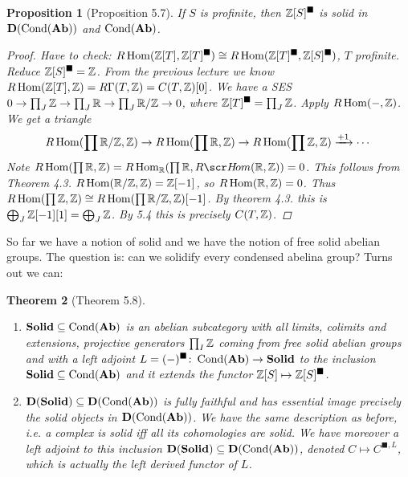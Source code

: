 \documentclass[A4paper, british, reqno]{amsart}
\theoremstyle{darkgreentheorem}
\newtheorem{thm}{Theorem}[section]
\newtheorem{prop}[thm]{Proposition}
\theoremstyle{darkbluedefinition}
\theoremstyle{darkredexample}
\theoremstyle{remark}
\DeclareMathOperator{\Hom}{Hom}
\DeclareMathOperator{\Cond}{Cond}
\newcommand{\Solid}{\mathbf{Solid}}
\newcommand{\1}{\mathbbm{1}}
\newcommand{\sub}{\subseteq}
\newcommand{\solid}{^{\blacksquare}}
\begin{document}
\begin{prop}[Proposition 5.7]
    If $S$ is profinite, then $\Z[S]\solid$ is solid in $\D(\Cond(\Ab))$ and $\Cond(\Ab)$.
    \begin{proof}
	Have to check: $R\Hom(\Z[T],\Z[T]\solid)\cong R\Hom(\Z[T]\solid,\Z[S]\solid)$, $T$ profinite.
	Reduce $\Z[S]\solid =\Z$.
	From the previous lecture we know $R\Hom(\Z[T],\Z)=R\Gamma (T,\Z)=C(T,\Z)[0]$.
	We have a SES $0\to \prod_{J}\mathbb{Z}\to \prod_{J}\mathbb{R}\to \prod_{J}\mathbb{R}/\mathbb{Z}\to 0$, where $\Z[T]\solid =\prod_{J}\Z$.
	Apply $R\Hom(-,\Z)$.
	We get a triangle
	\[R\Hom(\prod \R/\Z,\Z)\to R\Hom(\prod \R,\Z)\to R\Hom(\prod \Z,\Z)\xrightarrow{+1}\cdots\]
	Note $R\Hom(\prod \R,\Z)=R\Hom_{\R}(\prod \R, R\hom(\R,\Z))=0$.
	This follows from Theorem 4.3. $R\Hom(\R/\Z,\Z)=\Z[-1]$, so $R\Hom(\R,\Z)=0$.
	Thus $R\Hom(\prod\Z,\Z)\cong R\Hom(\prod \R/\Z,\Z)[-1]$.
	By theorem 4.3. this is $\bigoplus_{J}\mathbb{Z}[-1][1]=\bigoplus_{J}\mathbb{Z}$.
	By 5.4 this is precisely $C(T,\mathbb{Z})$.
    \end{proof}
\end{prop}

So far we have a notion of solid and we have the notion of free solid abelian groups.
The question is: can we solidify every condensed abelina group?
Turns out we can:

\begin{thm}[Theorem 5.8]
    \begin{enumerate}[label=\roman*)]
	\item $\Solid\sub \Cond(\Ab)$ is an abelian subcategory with all limits, colimits and extensions, projective generators $\prod_{I}\mathbb{Z}$ coming from free solid abelian groups and with a left adjoint $L=(-)\solid\colon \Cond(\Ab)\to \Solid$ to the inclusion $\Solid \sub \Cond(\Ab)$ and it extends the functor $\Z[S]\mapsto \Z[S]\solid$.
	\item $\D(\Solid)\sub \D(\Cond(\Ab))$ is fully faithful and has essential image precisely the solid objects in $\D(\Cond(\Ab))$.
	    We have the same description as before, i.e. a complex is solid iff all its cohomologies are solid.
	    We have moreover a left adjoint to this inclusion $\D(\Solid)\sub \D(\Cond(\Ab))$, denoted $C\mapsto C^{\blacksquare, L}$, which is actually the left derived functor of $L$.
    \end{enumerate}
\end{thm}
\end{document}
